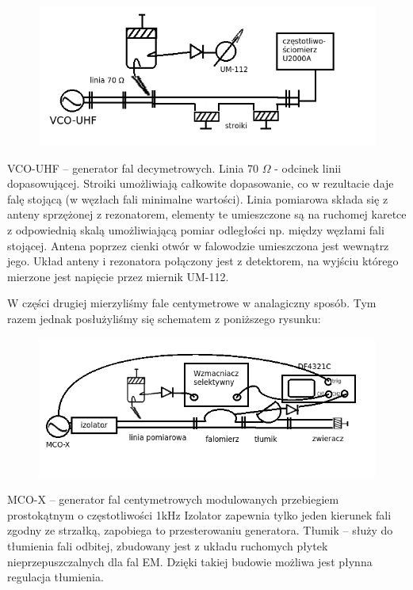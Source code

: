 \documentclass[a4paper,11pt]{article}
\begin{document}
\begin{figure} [H]
  \begin{center}
    \includegraphics{Edecy.png}
  \end{center}
\end{figure}
VCO-UHF – generator fal decymetrowych.
Linia 70 $\Omega$  - odcinek linii dopasowującej.
Stroiki umożliwiają całkowite dopasowanie, co w rezultacie daje falę stojącą (w węzłach fali minimalne wartości).
Linia pomiarowa składa się z anteny sprzężonej z rezonatorem, elementy te umieszczone są na ruchomej karetce z odpowiednią skalą umożliwiającą pomiar odległości np. między węzłami fali stojącej. Antena poprzez cienki otwór w falowodzie umieszczona jest wewnątrz jego. Układ anteny i rezonatora połączony jest z detektorem, na wyjściu którego mierzone jest napięcie przez miernik UM-112.

W części drugiej mierzyliśmy fale centymetrowe w analagiczny sposób. Tym razem jednak posłużyliśmy się schematem z poniższego rysunku: 
\begin{figure} [H]
  \begin{center}
    \includegraphics{Ecenty.png}
  \end{center}
\end{figure}
MCO-X – generator fal centymetrowych modulowanych przebiegiem prostokątnym o częstotliwości 1kHz
Izolator zapewnia tylko jeden kierunek fali zgodny ze strzałką, zapobiega to przesterowaniu generatora.
Tłumik – służy do tłumienia fali odbitej, zbudowany jest z układu ruchomych płytek nieprzepuszczalnych dla fal EM. Dzięki takiej budowie możliwa jest płynna regulacja tłumienia.
\end{document}
